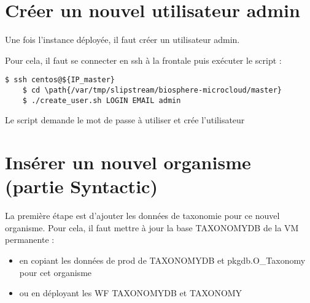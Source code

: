 \section{Créer un nouvel utilisateur admin}

Une fois l'instance déployée, il faut créer un utilisateur admin.

Pour cela, il faut se connecter en ssh à la frontale puis exécuter le script :
\begin{lstlisting}[style=Bash,gobble=4]
    $ ssh centos@${IP_master}
    $ cd \path{/var/tmp/slipstream/biosphere-microcloud/master}
    $ ./create_user.sh LOGIN EMAIL admin
\end{lstlisting}
Le script demande le mot de passe à utiliser et crée l'utilisateur

\section{Insérer un nouvel organisme (partie Syntactic)}

La première étape est d'ajouter les données de taxonomie pour ce nouvel organisme.
Pour cela, il faut mettre à jour la base TAXONOMYDB de la VM permanente :
\begin{itemize}
    \item en copiant les données de prod de TAXONOMYDB et pkgdb.O\_Taxonomy pour cet organisme
    \item ou en déployant les WF TAXONOMYDB et TAXONOMY
\end{itemize}
\bigskip

